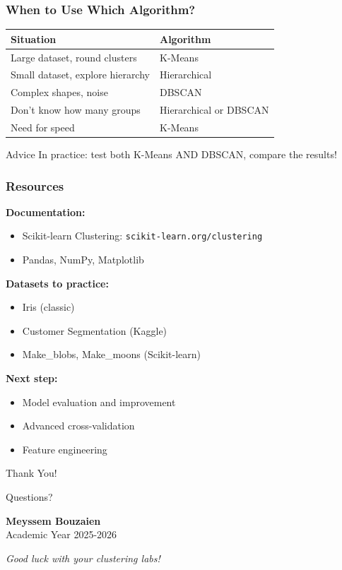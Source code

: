 \documentclass{beamer}
\begin{document}
\begin{frame}
\frametitle{When to Use Which Algorithm?}
\begin{table}
\centering
\small
\begin{tabular}{ll}
\toprule
\textbf{Situation} & \textbf{Algorithm} \\
\midrule
Large dataset, round clusters & K-Means \\
Small dataset, explore hierarchy & Hierarchical \\
Complex shapes, noise & DBSCAN \\
Don't know how many groups & Hierarchical or DBSCAN \\
Need for speed & K-Means \\
\bottomrule
\end{tabular}
\end{table}

\vspace{1em}
\begin{alertblock}{Advice}
In practice: test both K-Means AND DBSCAN, compare the results!
\end{alertblock}
\end{frame}

\begin{frame}
\frametitle{Resources}
\textbf{Documentation:}
\begin{itemize}
    \item Scikit-learn Clustering: \texttt{scikit-learn.org/clustering}
    \item Pandas, NumPy, Matplotlib
\end{itemize}

\vspace{1em}
\textbf{Datasets to practice:}
\begin{itemize}
    \item Iris (classic)
    \item Customer Segmentation (Kaggle)
    \item Make\_blobs, Make\_moons (Scikit-learn)
\end{itemize}

\vspace{1em}
\textbf{Next step:}
\begin{itemize}
    \item Model evaluation and improvement
    \item Advanced cross-validation
    \item Feature engineering
\end{itemize}
\end{frame}

\begin{frame}
\begin{center}
{\Huge Thank You!}

\vspace{2em}
{\Large Questions?}

\vspace{3em}
\textbf{Meyssem Bouzaien}\\
Academic Year 2025-2026

\vspace{2em}
\textit{Good luck with your clustering labs!}
\end{center}
\end{frame}
\end{document}
